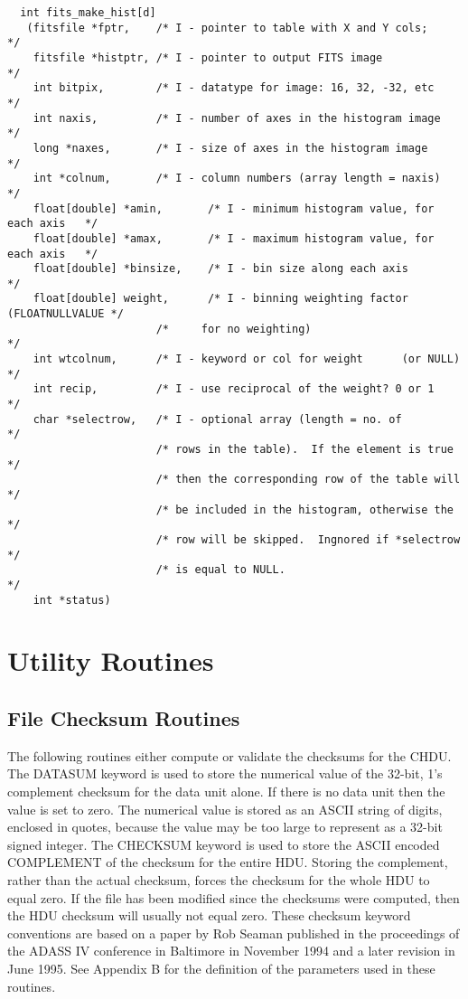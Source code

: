 \documentclass[11pt]{book}
\begin{document}
\begin{verbatim}
  int fits_make_hist[d]
   (fitsfile *fptr,    /* I - pointer to table with X and Y cols;      */
    fitsfile *histptr, /* I - pointer to output FITS image             */
    int bitpix,        /* I - datatype for image: 16, 32, -32, etc     */
    int naxis,         /* I - number of axes in the histogram image    */
    long *naxes,       /* I - size of axes in the histogram image      */
    int *colnum,       /* I - column numbers (array length = naxis)    */
    float[double] *amin,       /* I - minimum histogram value, for each axis   */
    float[double] *amax,       /* I - maximum histogram value, for each axis   */
    float[double] *binsize,    /* I - bin size along each axis                 */
    float[double] weight,      /* I - binning weighting factor (FLOATNULLVALUE */
                       /*     for no weighting)                        */
    int wtcolnum,      /* I - keyword or col for weight      (or NULL) */
    int recip,         /* I - use reciprocal of the weight? 0 or 1     */
    char *selectrow,   /* I - optional array (length = no. of          */
                       /* rows in the table).  If the element is true  */
                       /* then the corresponding row of the table will */
                       /* be included in the histogram, otherwise the  */
                       /* row will be skipped.  Ingnored if *selectrow */
                       /* is equal to NULL.                            */
    int *status)
\end{verbatim}



\section{Utility Routines}


\subsection{File Checksum Routines}

The following routines either compute or validate the checksums for the
CHDU.  The DATASUM keyword is used to store the numerical value of the
32-bit, 1's complement checksum for the data unit alone.  If there is
no data unit then the value is set to zero. The numerical value is
stored as an ASCII string of digits, enclosed in quotes, because the
value may be too large to represent as a 32-bit signed integer.  The
CHECKSUM keyword is used to store the ASCII encoded COMPLEMENT of the
checksum for the entire HDU.  Storing the complement, rather than the
actual checksum, forces the checksum for the whole HDU to equal zero.
If the file has been modified since the checksums were computed, then
the HDU checksum will usually not equal zero.  These checksum keyword
conventions are based on a paper by Rob Seaman published in the
proceedings of the ADASS IV conference in Baltimore in November 1994
and a later revision in June 1995.  See Appendix B for the definition
of the parameters used in these routines.
\end{document}
